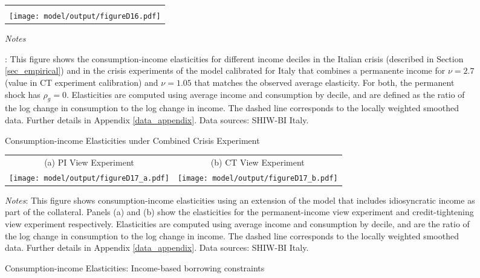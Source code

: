 \documentclass[12pt]{article}
\begin{document}
\begin{spacing}{1.5}
\begin{figure}[H]
\caption{Consumption-income Elasticities under Combined Crisis Experiment}
\label{fig: ident_mix}
\begin{tabular}{c}
\vspace{-1.7em} \\
 \texttt{[image: model/output/figureD16.pdf]}  \\
\end{tabular}
\flushleft\raggedright{}\textit{\footnotesize{}Notes}{: \footnotesize{This figure shows the consumption-income elasticities for different income deciles in the Italian crisis (described in Section \ref{sec_empirical}) and in the crisis experiments of the model calibrated for Italy that combines a permanente income for $\nu=2.7$ (value in CT experiment calibration) and $\nu=1.05$ that matches the observed average elasticity. For both, the permanent shock has $\rho_g = 0$.
Elasticities are computed using average income and consumption by decile, and are defined as the ratio of the log change in consumption to the log change in income. The dashed line corresponds to the locally weighted smoothed data. Further details in Appendix \ref{data_appendix}.
Data sources: SHIW-BI Italy.}{\footnotesize\par}}
\end{figure}

\begin{figure}[H]
\caption{Consumption-income Elasticities: Income-based borrowing constraints}
\label{fig: shock_incbased_bc}
\begin{tabular}{cc}
(a) PI View Experiment & (b)  CT View Experiment \\
 \texttt{[image: model/output/figureD17\_a.pdf]} &
 \texttt{[image: model/output/figureD17\_b.pdf]} \\
\end{tabular}
\raggedright{}\textit{\footnotesize{}Notes}{: \footnotesize{This figure shows consumption-income elasticities using an extension of the model that includes idiosyncratic income as part of the collateral.
Panels (a) and (b) show the elasticities for the permanent-income view experiment and credit-tightening view experiment respectively. Elasticities are computed using average income and consumption by decile, and are the ratio of the log change in consumption to the log change in income. The dashed line corresponds to the locally weighted smoothed data. Further details in Appendix \ref{data_appendix}.
Data sources: SHIW-BI Italy.}}{\footnotesize\par}
\end{figure}


\end{spacing}
\end{document}
